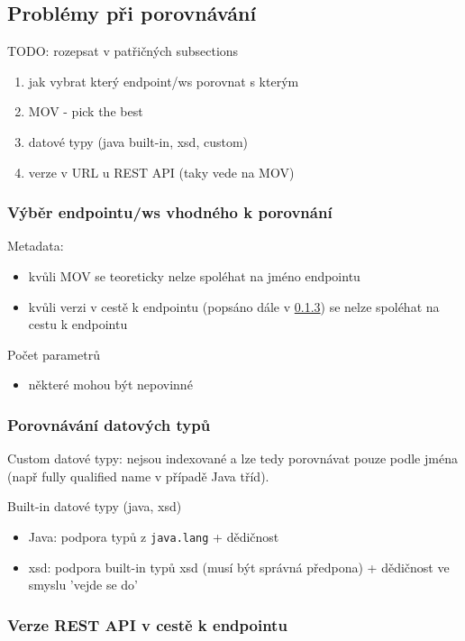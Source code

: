 \documentclass[czech,DP]{thesiskiv}
\begin{document}
\subsection{Problémy při porovnávání}	

TODO: rozepsat v patřičných subsections
\begin{enumerate}
	\item jak vybrat který endpoint/ws porovnat s kterým
	\item MOV - pick the best
	\item datové typy (java built-in, xsd, custom)
	\item verze v URL u REST API (taky vede na MOV)
\end{enumerate}
	
\subsubsection{Výběr endpointu/ws vhodného k porovnání}

Metadata:
\begin{itemize}
	\item kvůli MOV se teoreticky nelze spoléhat na jméno endpointu
	\item kvůli verzi v cestě k endpointu (popsáno dále v \ref{sec:api-path-version}) se nelze spoléhat na cestu k endpointu
\end{itemize}

Počet parametrů
\begin{itemize}
	\item některé mohou být nepovinné
\end{itemize}
 
\subsubsection{Porovnávání datových typů}
Custom datové typy: nejsou indexované a lze tedy porovnávat pouze podle jména (např fully qualified name v případě Java tříd).
 
Built-in datové typy (java, xsd)

\begin{itemize}
	\item Java: podpora typů z \verb|java.lang| + dědičnost
	\item xsd: podpora built-in typů xsd (musí být správná předpona) + dědičnost ve smyslu 'vejde se do'
\end{itemize}

	
\subsubsection{Verze REST API v cestě k endpointu}	
\label{sec:api-path-version}
\end{document}
